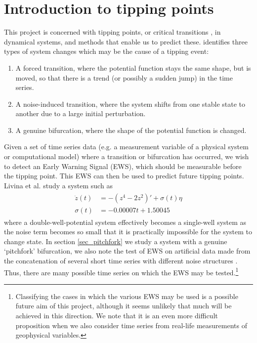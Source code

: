 \documentclass[11pt,a4paper,reqno]{article}
\numberwithin{equation}{section}
\begin{document}
\section{Introduction to tipping points}
\label{sec_tippingpoints}

This project is concerned with tipping points, or critical transitions \cite{scheffer2009}, in dynamical systems, and methods that enable us to predict these. \cite{livina2011} identifies three types of system changes which may be the cause of a tipping event:
\begin{enumerate}
\item A forced transition, where the potential function stays the same shape, but is moved, so that there is a trend (or possibly a sudden jump) in the time series.
\item A noise-induced transition, where the system shifts from one stable state to another due to a large initial perturbation.
\item A genuine bifurcation, where the shape of the potential function is changed. 
\end{enumerate}
Given a set of time series data (e.g. a measurement variable of a physical system or computational model) where a transition or bifurcation has occurred, we wish to detect an Early Warning Signal (EWS), which should be measurable before the tipping point. This EWS can then be used to predict future tipping points.\\

Livina et al. \cite{livina2011} study a system such as
\begin{align}
\begin{split}
\label{noise_wells}
\dot{z}(t) & = -(z^4 - 2z^2)' + \sigma(t)\eta \\
\sigma(t) & = -0.00007t+1.50045
\end{split}
\end{align}
where a double-well-potential system effectively becomes a single-well system as the noise term becomes so small that it is practically impossible for the system to change state. In section \ref{sec_pitchfork} we study a system with a genuine `pitchfork' bifurcation, we also note the test of EWS on artificial data made from the concatenation of several short time series with different noise structures \cite{livina2012}. Thus, there are many possible time series on which the EWS may be tested.\footnote{Classifying the cases in which the various EWS may be used is a possible future aim of this project, although it seems unlikely that much will be achieved in this direction. We note that it is an even more difficult proposition when we also consider time series from real-life measurements of geophysical variables.}\marginpar{\large $\star$}
\end{document}
